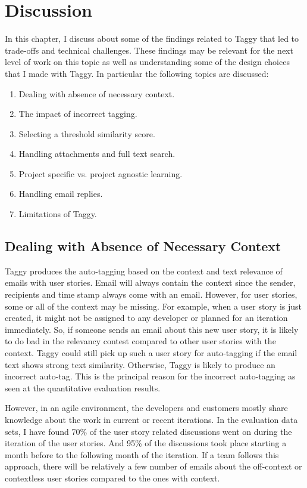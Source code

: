\fancyhead[RO,LE]{\thepage}
\fancyfoot{} 
\chapter{Discussion}
\label{ch:discussion}
In this chapter, I discuss about some of the findings related to Taggy that led to trade-offs and technical challenges. These findings may be relevant for the next level of work on this topic as well as understanding some of the design choices that I made with Taggy. In particular the following topics are discussed:

\begin{enumerate}
	\item Dealing with absence of necessary context.
	\item The impact of incorrect tagging.
	\item Selecting a threshold similarity score.	
	\item Handling attachments and full text search.	
	\item Project specific vs. project agnostic learning.
	\item Handling email replies.
	\item Limitations of Taggy.
\end{enumerate}

\section{Dealing with Absence of Necessary Context}
Taggy produces the auto-tagging based on the context and text relevance of emails with user stories. Email will always contain the context since the sender, recipients and time stamp always come with an email. However, for user stories, some or all of the context may be missing. For example, when a user story is just created, it might not be assigned to any developer or planned for an iteration immediately. So, if someone sends an email about this new user story, it is likely to do bad in the relevancy contest compared to other user stories with the context. Taggy could still pick up such  a user story for auto-tagging if the email text shows strong text similarity. Otherwise, Taggy is likely to produce an incorrect auto-tag. This is the principal reason for the incorrect auto-tagging as seen at the quantitative evaluation results.

However, in an agile environment, the developers and customers mostly share knowledge about the work in current or recent iterations. In the evaluation data sets, I have found 70\% of the user story related discussions went on during the iteration of the user stories. And 95\% of the discussions took place starting a month before to the following month of the iteration. If a team follows this approach, there will be relatively a few number of emails about the off-context or contextless user stories compared to the ones with context.


